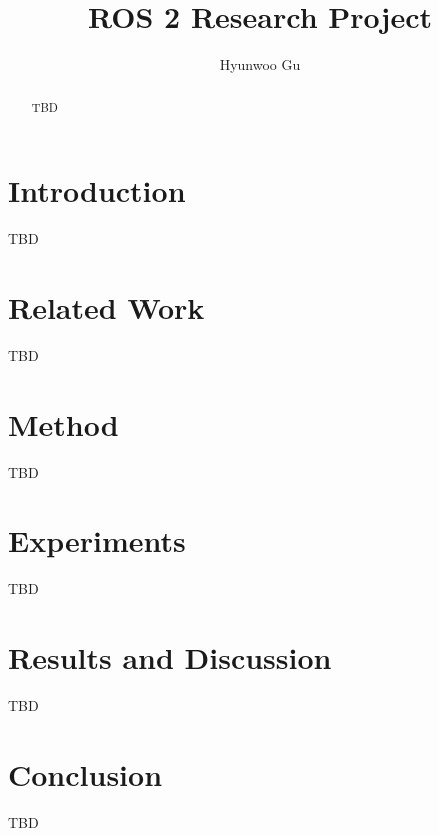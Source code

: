 \documentclass{article}
\title{ROS 2 Research Project}
\author{Hyunwoo Gu}
\begin{document}
\maketitle
\begin{abstract}
TBD
\end{abstract}
\section{Introduction}
TBD
\section{Related Work}
TBD
\section{Method}
TBD
\section{Experiments}
TBD
\section{Results and Discussion}
TBD
\section{Conclusion}
TBD
\end{document}
